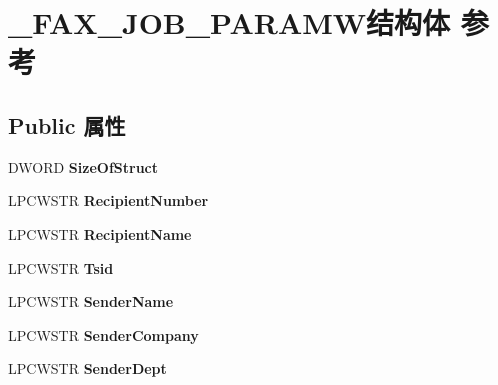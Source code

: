 \hypertarget{struct___f_a_x___j_o_b___p_a_r_a_m_w}{}\section{\+\_\+\+F\+A\+X\+\_\+\+J\+O\+B\+\_\+\+P\+A\+R\+A\+M\+W结构体 参考}
\label{struct___f_a_x___j_o_b___p_a_r_a_m_w}
\subsection*{Public 属性}
\begin{DoxyCompactItemize}
\item 
\mbox{\label{struct___f_a_x___j_o_b___p_a_r_a_m_w_af57f68072b67e74ad55ecb2edda9f791}} 
D\+W\+O\+RD {\bfseries Size\+Of\+Struct}
\item 
\mbox{\label{struct___f_a_x___j_o_b___p_a_r_a_m_w_a2750a867fc2e59f1307f53ca69c8a2b5}} 
L\+P\+C\+W\+S\+TR {\bfseries Recipient\+Number}
\item 
\mbox{\label{struct___f_a_x___j_o_b___p_a_r_a_m_w_aa4854b7a728f53bc5e8388830d57fb7e}} 
L\+P\+C\+W\+S\+TR {\bfseries Recipient\+Name}
\item 
\mbox{\label{struct___f_a_x___j_o_b___p_a_r_a_m_w_abb675c4e39fc7dfdf4715cc5c7d123e5}} 
L\+P\+C\+W\+S\+TR {\bfseries Tsid}
\item 
\mbox{\label{struct___f_a_x___j_o_b___p_a_r_a_m_w_a3cf0bcdda156686fa1d045370aae1cbe}} 
L\+P\+C\+W\+S\+TR {\bfseries Sender\+Name}
\item 
\mbox{\label{struct___f_a_x___j_o_b___p_a_r_a_m_w_a233d2b951d13bb8d919696ab58abcf1a}} 
L\+P\+C\+W\+S\+TR {\bfseries Sender\+Company}
\item 
\mbox{\label{struct___f_a_x___j_o_b___p_a_r_a_m_w_a22cb47739ff90876a36016e23a441579}} 
L\+P\+C\+W\+S\+TR {\bfseries Sender\+Dept}
\item 
\mbox{\label{struct___f_a_x___j_o_b___p_a_r_a_m_w_ab61c1bfa357de97c49303b2be580c643}} 

\end{DoxyCompactItemize}
